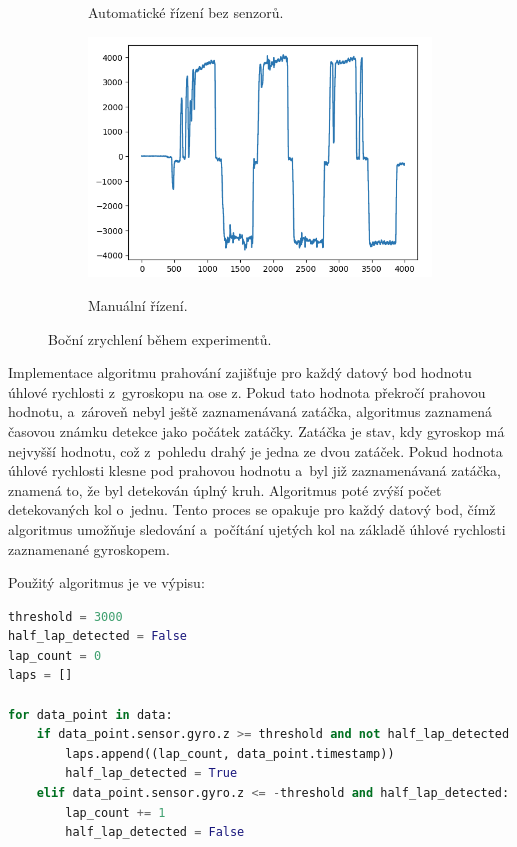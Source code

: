 \begin{figure}[!h]
\begin{subfigure}{.5\textwidth}
        \label{fig:LapsAuto}
        \caption{Automatické řízení bez senzorů.}
    \end{subfigure}
    \begin{subfigure}{.5\textwidth}
        \includegraphics[width = \textwidth]{Figures/LapManual.png}
        \label{fig:LapsManual}
        \caption{Manuální řízení.}
    \end{subfigure}
    \captionsetup{justification=centering}
    \caption{Boční zrychlení během experimentů.}
    \label{fig:Laps}
\end{figure}

Implementace algoritmu prahování zajišťuje pro každý datový bod hodnotu úhlové
rychlosti z~gyroskopu na ose z. Pokud tato hodnota překročí prahovou hodnotu,
a~zároveň nebyl ještě zaznamenávaná zatáčka, algoritmus zaznamená časovou známku detekce
jako počátek zatáčky. Zatáčka je stav, kdy gyroskop má nejvyšší hodnotu, což z~pohledu drahý je jedna ze dvou zatáček. Pokud hodnota úhlové rychlosti klesne pod prahovou hodnotu
a~byl již zaznamenávaná zatáčka, znamená to, že byl detekován úplný kruh. Algoritmus
poté zvýší počet detekovaných kol o~jednu. Tento proces se opakuje pro každý datový
bod, čímž algoritmus umožňuje sledování a~počítání ujetých kol na základě úhlové rychlosti
zaznamenané gyroskopem. 

Použitý algoritmus je ve výpisu:


\begin{lstlisting}[language = python, caption = Počet kol, label = lst:countLap]
threshold = 3000
half_lap_detected = False
lap_count = 0
laps = []

for data_point in data:
    if data_point.sensor.gyro.z >= threshold and not half_lap_detected:
        laps.append((lap_count, data_point.timestamp))
        half_lap_detected = True
    elif data_point.sensor.gyro.z <= -threshold and half_lap_detected:
        lap_count += 1
        half_lap_detected = False
\end{lstlisting}

